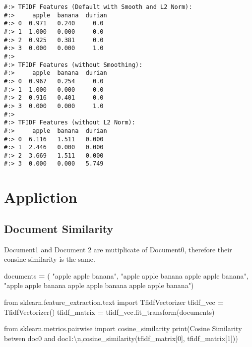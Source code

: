 \documentclass[
]{book}
\newenvironment{Shaded}{\begin{snugshade}}{\end{snugshade}}
\newcommand{\BuiltInTok}[1]{#1}
\newcommand{\CharTok}[1]{\textcolor[rgb]{0.5,0.5,0.5}{#1}}
\newcommand{\DecValTok}[1]{\textcolor[rgb]{0.06,0.06,0.06}{#1}}
\newcommand{\ImportTok}[1]{#1}
\newcommand{\NormalTok}[1]{#1}
\newcommand{\OperatorTok}[1]{\textcolor[rgb]{0.43,0.43,0.43}{\textbf{#1}}}
\newcommand{\StringTok}[1]{\textcolor[rgb]{0.5,0.5,0.5}{#1}}
\begin{document}
\begin{verbatim}
#:> TFIDF Features (Default with Smooth and L2 Norm):
#:>     apple  banana  durian
#:> 0  0.971   0.240     0.0
#:> 1  1.000   0.000     0.0
#:> 2  0.925   0.381     0.0
#:> 3  0.000   0.000     1.0 
#:> 
#:> TFIDF Features (without Smoothing):
#:>     apple  banana  durian
#:> 0  0.967   0.254     0.0
#:> 1  1.000   0.000     0.0
#:> 2  0.916   0.401     0.0
#:> 3  0.000   0.000     1.0 
#:> 
#:> TFIDF Features (without L2 Norm):
#:>     apple  banana  durian
#:> 0  6.116   1.511   0.000
#:> 1  2.446   0.000   0.000
#:> 2  3.669   1.511   0.000
#:> 3  0.000   0.000   5.749
\end{verbatim}

\hypertarget{appliction}{%
\section{Appliction}\label{appliction}}

\hypertarget{document-similarity}{%
\subsection{Document Similarity}\label{document-similarity}}

Document1 and Document 2 are mutiplicate of Document0, therefore their consine similarity is the same.

\begin{Shaded}
\begin{Highlighting}[]
\NormalTok{documents }\OperatorTok{=}\NormalTok{ (}
    \StringTok{"apple apple banana"}\NormalTok{,}
    \StringTok{"apple apple banana apple apple banana"}\NormalTok{,}
    \StringTok{"apple apple banana apple apple banana apple apple banana"}\NormalTok{)}
    
\ImportTok{from}\NormalTok{ sklearn.feature\_extraction.text }\ImportTok{import}\NormalTok{ TfidfVectorizer}
\NormalTok{tfidf\_vec }\OperatorTok{=}\NormalTok{ TfidfVectorizer()}
\NormalTok{tfidf\_matrix }\OperatorTok{=}\NormalTok{ tfidf\_vec.fit\_transform(documents)}

\ImportTok{from}\NormalTok{ sklearn.metrics.pairwise }\ImportTok{import}\NormalTok{ cosine\_similarity}
\BuiltInTok{print}\NormalTok{(}\StringTok{\textquotesingle{}Cosine Similarity betwen doc0 and doc1:}\CharTok{\textbackslash{}n}\StringTok{\textquotesingle{}}\NormalTok{,cosine\_similarity(tfidf\_matrix[}\DecValTok{0}\NormalTok{], tfidf\_matrix[}\DecValTok{1}\NormalTok{]))}
\end{Highlighting}
\end{Shaded}
\end{document}
